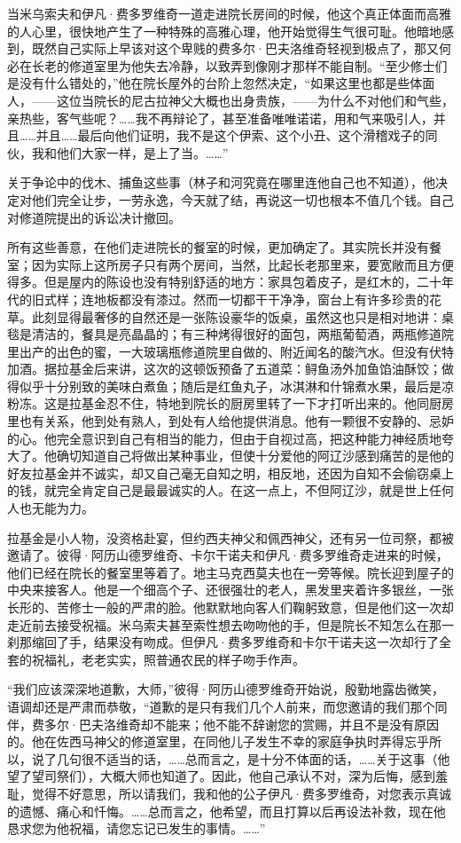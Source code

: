 \par 当米乌索夫和伊凡·费多罗维奇一道走进院长房间的时候，他这个真正体面而高雅的人心里，很快地产生了一种特殊的高雅心理，他开始觉得生气很可耻。他暗地感到，既然自己实际上早该对这个卑贱的费多尔·巴夫洛维奇轻视到极点了，那又何必在长老的修道室里为他失去冷静，以致弄到像刚才那样不能自制。“至少修士们是没有什么错处的，”他在院长屋外的台阶上忽然决定，“如果这里也都是些体面人，——这位当院长的尼古拉神父大概也出身贵族，——为什么不对他们和气些，亲热些，客气些呢？……我不再辩论了，甚至准备唯唯诺诺，用和气来吸引人，并且……并且……最后向他们证明，我不是这个伊索、这个小丑、这个滑稽戏子的同伙，我和他们大家一样，是上了当。……”
\par 关于争论中的伐木、捕鱼这些事（林子和河究竟在哪里连他自己也不知道），他决定对他们完全让步，一劳永逸，今天就了结，再说这一切也根本不值几个钱。自己对修道院提出的诉讼决计撤回。
\par 所有这些善意，在他们走进院长的餐室的时候，更加确定了。其实院长并没有餐室；因为实际上这所房子只有两个房间，当然，比起长老那里来，要宽敞而且方便得多。但是屋内的陈设也没有特别舒适的地方：家具包着皮子，是红木的，二十年代的旧式样；连地板都没有漆过。然而一切都干干净净，窗台上有许多珍贵的花草。此刻显得最奢侈的自然还是一张陈设豪华的饭桌，虽然这也只是相对地讲：桌毯是清洁的，餐具是亮晶晶的；有三种烤得很好的面包，两瓶葡萄酒，两瓶修道院里出产的出色的蜜，一大玻璃瓶修道院里自做的、附近闻名的酸汽水。但没有伏特加酒。据拉基金后来讲，这次的这顿饭预备了五道菜：鲟鱼汤外加鱼馅油酥饺；做得似乎十分别致的美味白煮鱼；随后是红鱼丸子，冰淇淋和什锦煮水果，最后是凉粉冻。这是拉基金忍不住，特地到院长的厨房里转了一下才打听出来的。他同厨房里也有关系，他到处有熟人，到处有人给他提供消息。他有一颗很不安静的、忌妒的心。他完全意识到自己有相当的能力，但由于自视过高，把这种能力神经质地夸大了。他确切知道自己将做出某种事业，但使十分爱他的阿辽沙感到痛苦的是他的好友拉基金并不诚实，却又自己毫无自知之明，相反地，还因为自知不会偷窃桌上的钱，就完全肯定自己是最最诚实的人。在这一点上，不但阿辽沙，就是世上任何人也无能为力。
\par 拉基金是小人物，没资格赴宴，但约西夫神父和佩西神父，还有另一位司祭，都被邀请了。彼得·阿历山德罗维奇、卡尔干诺夫和伊凡·费多罗维奇走进来的时候，他们已经在院长的餐室里等着了。地主马克西莫夫也在一旁等候。院长迎到屋子的中央来接客人。他是一个细高个子、还很强壮的老人，黑发里夹着许多银丝，一张长形的、苦修士一般的严肃的脸。他默默地向客人们鞠躬致意，但是他们这一次却走近前去接受祝福。米乌索夫甚至索性想去吻吻他的手，但是院长不知怎么在那一刹那缩回了手，结果没有吻成。但伊凡·费多罗维奇和卡尔干诺夫这一次却行了全套的祝福礼，老老实实，照普通农民的样子吻手作声。
\par “我们应该深深地道歉，大师，”彼得·阿历山德罗维奇开始说，殷勤地露齿微笑，语调却还是严肃而恭敬，“道歉的是只有我们几个人前来，而您邀请的我们那个同伴，费多尔·巴夫洛维奇却不能来；他不能不辞谢您的赏赐，并且不是没有原因的。他在佐西马神父的修道室里，在同他儿子发生不幸的家庭争执时弄得忘乎所以，说了几句很不适当的话，……总而言之，是十分不体面的话，……关于这事（他望了望司祭们），大概大师也知道了。因此，他自己承认不对，深为后悔，感到羞耻，觉得不好意思，所以请我们，我和他的公子伊凡·费多罗维奇，对您表示真诚的遗憾、痛心和忏悔。……总而言之，他希望，而且打算以后再设法补救，现在他恳求您为他祝福，请您忘记已发生的事情。……”
